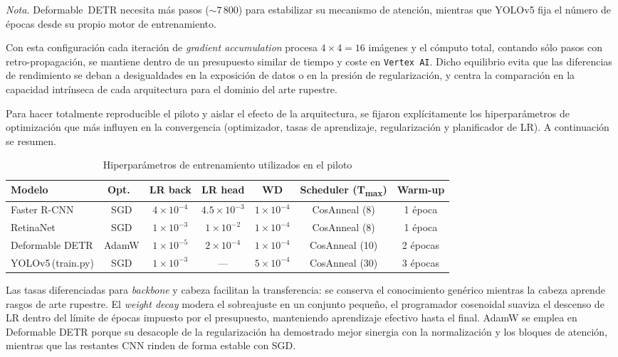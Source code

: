 \noindent\small
\textit{Nota.} Deformable~DETR necesita más pasos (\(\sim 7\,800\)) para estabilizar su mecanismo de atención, mientras que YOLOv5 fija el número de épocas desde su propio motor de entrenamiento.

\noindent
Con esta configuración cada iteración de \textit{gradient accumulation} procesa \(4\times4=16\) imágenes y el cómputo total, contando sólo pasos con retro-propagación, se mantiene dentro de un presupuesto similar de tiempo y coste en \texttt{Vertex AI}.
Dicho equilibrio evita que las diferencias de rendimiento se deban a desigualdades en la exposición de datos o en la presión de regularización, y centra la comparación en la capacidad intrínseca de cada arquitectura para el dominio del arte rupestre.

Para hacer totalmente reproducible el piloto y aislar el efecto de la arquitectura, se fijaron explícitamente los hiperparámetros de optimización que más influyen en la convergencia (optimizador, tasas de aprendizaje, regularización y planificador de LR).  A continuación se resumen.

\begin{table}[!h]
\centering
\caption{Hiperparámetros de entrenamiento utilizados en el piloto}
\label{tab:pilot_hparams}
\begin{tabular}{lcccccc}
\hline
\textbf{Modelo} & Opt.\ & LR back & LR head & WD & Scheduler (T\textsubscript{max}) & Warm-up \\
\hline
Faster R-CNN         & SGD   & $4\times10^{-4}$ & $4.5\times10^{-3}$ & $1\times10^{-4}$ & CosAnneal (8)  & 1 época \\
RetinaNet            & SGD   & $1\times10^{-3}$ & $1\times10^{-2}$   & $1\times10^{-4}$ & CosAnneal (8)  & 1 época \\
Deformable DETR      & AdamW & $1\times10^{-5}$ & $2\times10^{-4}$   & $1\times10^{-4}$ & CosAnneal (10) & 2 épocas \\
YOLOv5\,(train.py)   & SGD   & $1\times10^{-3}$ & —                 & $5\times10^{-4}$ & CosAnneal (30) & 3 épocas \\
\hline
\end{tabular}
\end{table}

\noindent
Las tasas diferenciadas para \textit{backbone} y cabeza facilitan la transferencia: se conserva el conocimiento genérico mientras la cabeza aprende rasgos de arte rupestre.
El \textit{weight decay} modera el sobreajuste en un conjunto pequeño, el programador cosenoidal suaviza el descenso de LR dentro del límite de épocas impuesto por el presupuesto, manteniendo aprendizaje efectivo hasta el final.
AdamW se emplea en Deformable DETR porque su desacople de la regularización ha demostrado mejor sinergia con la normalización y los bloques de atención, mientras que las restantes CNN rinden de forma estable con SGD.

